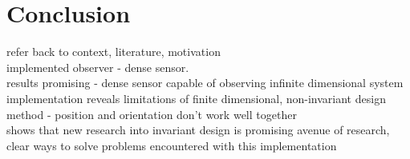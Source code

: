 \chapter*{Conclusion}
refer back to context, literature, motivation\\

implemented observer - dense sensor.\\
results promising - dense sensor capable of observing infinite dimensional system\\
implementation reveals limitations of finite dimensional, non-invariant design method - position and orientation don't work well together\\
shows that new research into invariant design is promising avenue of research, clear ways to solve problems encountered with this implementation
